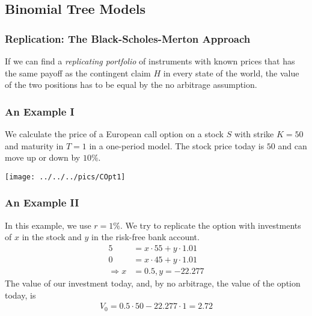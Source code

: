 \subsection{Binomial Tree Models}

\begin{frame}[fragile]
\frametitle{Replication: The Black-Scholes-Merton Approach}
If we can find a \emph{replicating portfolio} of instruments with known prices
that has the same payoff as the contingent claim $H$ in every state of the world, the value of the
two positions has to be equal by the no arbitrage assumption.
\end{frame}

\begin{frame}[fragile]
\frametitle{An Example I}
We calculate the price of a European call option on a stock $S$ with strike
$K=50$ and maturity in $T=1$ in a one-period model. The stock price today is
$50$ and can move up or down by $10\%$.

\center
\texttt{[image: ../../../pics/COpt1]}
\end{frame}

\begin{frame}[fragile]
\frametitle{An Example II}
In this example, we use $r=1\%$. We try to replicate the option with
investments of $x$ in the stock and $y$ in the risk-free bank account.
\begin{align*}
  5 &= x \cdot 55 + y \cdot 1.01 \\
  0 &= x \cdot 45 + y \cdot 1.01 \\
  \Rightarrow  x &= 0.5, y= -22.277
\end{align*}
The value of our investment today, and, by no arbitrage, the value of the option
today, is
\begin{align*}
  V_0 = 0.5 \cdot 50 -22.277 \cdot 1 = 2.72
\end{align*}
\end{frame}

